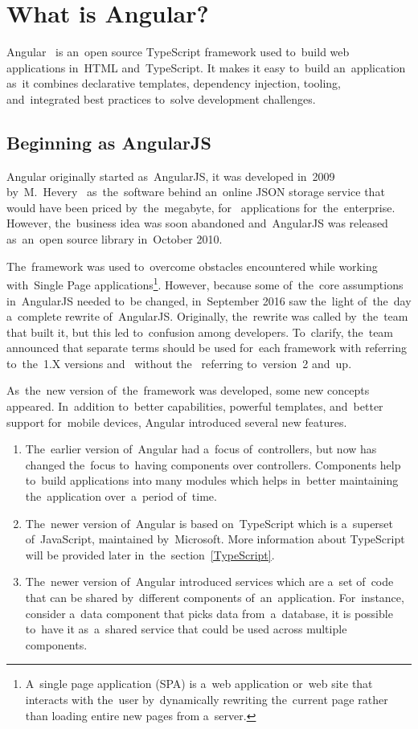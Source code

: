 \section{What is Angular?}
Angular~\cite{Angular} is an~open source TypeScript framework used to~build web
applications in~HTML and~TypeScript. It makes it easy to~build an~application
as~it combines declarative templates, dependency injection, 
tooling, and~integrated best practices to~solve development challenges.


\subsection{Beginning as AngularJS}
Angular originally started as~AngularJS, it was developed in~2009
by~M.~Hevery~\cite{HeveryAngularJS} as~the~software behind an~online JSON
storage service that would have been priced by~the~megabyte,
for~ applications for~the~enterprise. However, the~business
idea was soon abandoned and~AngularJS was released as~an~open source library
in~October 2010.

The~framework was used to~overcome obstacles encountered while working
with~Single Page applications\footnote{A~single page application (SPA) is a~web
application or~web site that interacts with the~user by~dynamically rewriting
the~current page rather than loading entire new pages from a~server.}.
However, because some of~the~core assumptions in~AngularJS needed to~be changed,
in~September 2016 saw the~light of~the~day a~complete rewrite of~AngularJS.
Originally, the~rewrite was called  by~the~team that built it, but
this led to~confusion among developers. To~clarify, the~team announced that
separate terms should be used for~each framework with  referring
to~the~1.X versions and~ without the~ referring to~version~2
and~up.

As~the~new version of~the~framework was developed, some new concepts appeared.
In~addition to~better  capabilities, powerful templates,
and~better support for~mobile devices, Angular introduced several new features.

\begin{enumerate}
  \item The~earlier version of~Angular had a~focus of~controllers, but now has
  changed the~focus to~having components over controllers. Components help
  to~build applications into many modules which helps in~better maintaining
  the~application over~a~period of~time.
  \item The~newer version of~Angular is based on~TypeScript which is a~superset
  of~JavaScript, maintained by~Microsoft. More information about TypeScript will
  be provided later in~the~section~\ref{TypeScript}.
  \item The~newer version of~Angular introduced services which are a~set of~code
  that can be shared by~different components of~an~application. For~instance,
  consider a~data component that picks data from~a~database, it is possible
  to~have it as~a~shared service that could be used across multiple
  components.
\end{enumerate}



